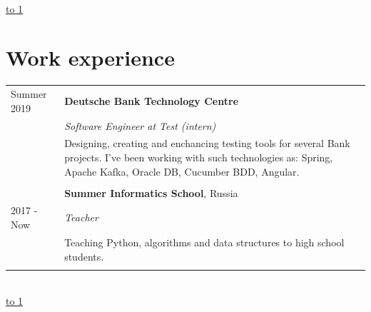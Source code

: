 \documentclass[10pt]{article}
\def\LINE{\vspace*{-1em}\noindent \underline{\hbox to 1\textwidth{{ } \hfil{ } \hfil{ } }}}
\begin{document}


\  \\

\LINE
\section*{\color{accent} Work experience}
\begin{tabular}{p{2.5cm}|p{14cm}}

  Summer 2019 & \textbf{Deutsche Bank Technology Centre} \\
    & \emph{Software Engineer at Test (intern)}\\
  & \footnotesize{Designing, creating and enchancing testing tools for several Bank projects. \newline I've been working with such technologies as: Spring, Apache Kafka, Oracle DB, Cucumber BDD, Angular.}\\
  \\
   \  & \textbf{Summer Informatics School}, Russia \\
   2017 - Now &\emph{Teacher}\\
   \  &\footnotesize{Teaching Python, algorithms and data structures to high school students.}\\\multicolumn{2}{c}{} \\
\end{tabular}
\\
\LINE
\end{document}
